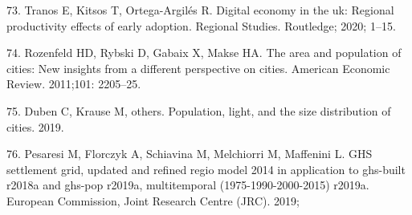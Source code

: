 \documentclass[10pt,letterpaper]{article}
\begin{document}
\leavevmode\hypertarget{ref-tranos2020digital}{}%
73. Tranos E, Kitsos T, Ortega-Argilés R. Digital economy in the uk:
Regional productivity effects of early adoption. Regional Studies.
Routledge; 2020; 1--15.

\leavevmode\hypertarget{ref-rozenfeld2011area}{}%
74. Rozenfeld HD, Rybski D, Gabaix X, Makse HA. The area and population
of cities: New insights from a different perspective on cities. American
Economic Review. 2011;101: 2205--25.

\leavevmode\hypertarget{ref-duben2019population}{}%
75. Duben C, Krause M, others. Population, light, and the size
distribution of cities. 2019.

\leavevmode\hypertarget{ref-pesaresi2019ghs}{}%
76. Pesaresi M, Florczyk A, Schiavina M, Melchiorri M, Maffenini L. GHS
settlement grid, updated and refined regio model 2014 in application to
ghs-built r2018a and ghs-pop r2019a, multitemporal (1975-1990-2000-2015)
r2019a. European Commission, Joint Research Centre (JRC). 2019;

\nolinenumbers
\end{document}
